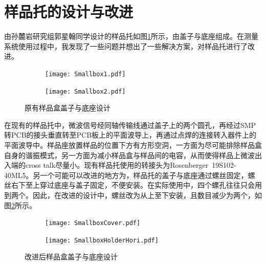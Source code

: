             \section{样品托的设计与改进} %
            \label{sec:样品托的设计与改进}

            由孙麓岩研究组郭星翰同学设计的样品托如图\ref{fig:oldSampleBox}所示，由盖子与底座组成。在测量系统使用过程中，我发现了一些问题并想出了一些解决方案，对样品托进行了改进。

\begin{figure}[h]
  \centering%
  \begin{subfigure}{0.4\textwidth}
    \texttt{[image: Smallbox1.pdf]}
  \end{subfigure}%
  \begin{subfigure}{0.4\textwidth}
    \texttt{[image: Smallbox2.pdf]}
  \end{subfigure}
  \caption{原有样品盒盖子与底座设计}
  \label{fig:oldSampleBox}
\end{figure}


            在现有的样品托中，微波信号经同轴传输线通过盖子上的两个圆孔，再经过SMP转PCB的接头垂直转至PCB板上的平面波导上，再通过点焊的连接转入器件上的平面波导中。样品座放置样品的位置下方有方形空洞，一方面为尽可能排除样品盒自身的谐振模式，另一方面为减小样品盒与样品间的电容，从而使得样品上微波出入端的cross talk尽量小\cite{Wenner2011}。现有样品托使用的转接头为Rosenberger~19S102-40ML5。另一个可能可以改进的地方为，样品托的盖子与底座通过螺丝固定，螺丝右下至上穿过底座与盖子固定，不便安装。在实际使用中，四个螺孔往往只会用到两个。因此，在改进的设计中，螺丝改为从上至下安装，且数目减少为两个，如图\ref{fig:newSampleBox}所示。



\begin{figure}[h]
  \centering%
  \begin{subfigure}{0.4\textwidth}
    \texttt{[image: SmallboxCover.pdf]}
  \end{subfigure}%
  \begin{subfigure}{0.4\textwidth}
    \texttt{[image: SmallboxHolderHori.pdf]}
  \end{subfigure}
  \caption{改进后样品盒盖子与底座设计}
  \label{fig:newSampleBox}
\end{figure}


